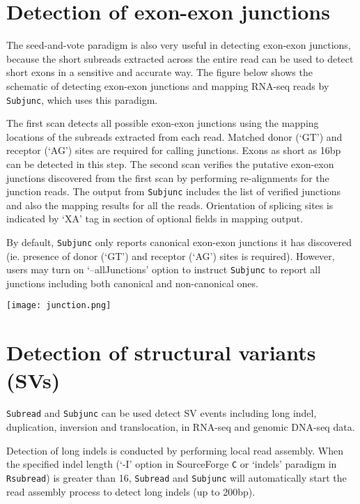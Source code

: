 \documentclass[12pt]{report}
\newcommand{\code}[1]{{\small\texttt{#1}}}
\begin{document}
\section{Detection of exon-exon junctions}
\label{sec:junction}

The seed-and-vote paradigm is also very useful in detecting exon-exon junctions, because the short subreads extracted across the entire read can be used to detect short exons in a sensitive and accurate way.
The figure below shows the schematic of detecting exon-exon junctions and mapping RNA-seq reads by \code{Subjunc}, which uses this paradigm.

The first scan detects all possible exon-exon junctions using the mapping locations of the subreads extracted from each read.
Matched donor (`GT') and receptor (`AG') sites are required for calling junctions.
Exons as short as 16bp can be detected in this step.
The second scan verifies the putative exon-exon junctions discovered from the first scan by performing re-alignments for the junction reads.
The output from \code{Subjunc} includes the list of verified junctions and also the mapping results for all the reads.
Orientation of splicing sites is indicated by `XA' tag in section of optional fields in mapping output.

By default, \code{Subjunc} only reports canonical exon-exon junctions it has discovered (ie. presence of donor (`GT') and receptor (`AG') sites is required).
However, users may turn on `--allJunctions' option to instruct \code{Subjunc} to report all junctions including both canonical and non-canonical ones.



\begin{center}
\texttt{[image: junction.png]}
\end{center}


\section{Detection of structural variants (SVs)}

\code{Subread} and \code{Subjunc} can be used detect SV events including long indel, duplication, inversion and translocation, in RNA-seq and genomic DNA-seq data.

Detection of long indels is conducted by performing local read assembly.
When the specified indel length (`-I' option in SourceForge \code{C} or `indels' paradigm in \code{Rsubread}) is greater than 16, \code{Subread} and \code{Subjunc} will automatically start the read assembly process to detect long indels (up to 200bp).
\end{document}
